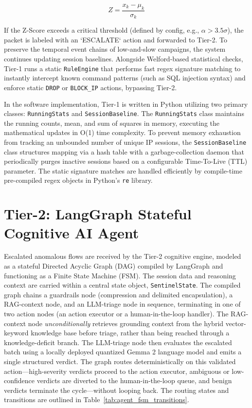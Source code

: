 \begin{equation}
    Z = \frac{x_k - \mu_k}{\sigma_k}
\end{equation}

If the Z-Score exceeds a critical threshold (defined by config, e.g., $\alpha > 3.5\sigma$), the packet is labeled with an `ESCALATE` action and forwarded to Tier-2. To preserve the temporal event chains of low-and-slow campaigns, the system continues updating session baselines. Alongside Welford-based statistical checks, Tier-1 runs a static \texttt{RuleEngine} that performs fast regex signature matching to instantly intercept known command patterns (such as SQL injection syntax) and enforce static \texttt{DROP} or \texttt{BLOCK\_IP} actions, bypassing Tier-2.

In the software implementation, Tier-1 is written in Python utilizing two primary classes: \texttt{RunningStats} and \texttt{SessionBaseline}. The \texttt{RunningStats} class maintains the running counts, mean, and sum of squares in memory, executing the mathematical updates in O(1) time complexity. To prevent memory exhaustion from tracking an unbounded number of unique IP sessions, the \texttt{SessionBaseline} class structures mapping via a hash table with a garbage-collection daemon that periodically purges inactive sessions based on a configurable Time-To-Live (TTL) parameter. The static signature matches are handled efficiently by compile-time pre-compiled regex objects in Python's \texttt{re} library.

\section{Tier-2: LangGraph Stateful Cognitive AI Agent}

Escalated anomalous flows are received by the Tier-2 cognitive engine, modeled as a stateful Directed Acyclic Graph (DAG) compiled by LangGraph \cite{langgraph2024} and functioning as a Finite State Machine (FSM). The session data and reasoning context are carried within a central state object, \texttt{SentinelState}. The compiled graph chains a guardrails node (compression and delimited encapsulation), a RAG-context node, and an LLM-triage node in sequence, terminating in one of two action nodes (an action executor or a human-in-the-loop handler). The RAG-context node \emph{unconditionally} retrieves grounding context from the hybrid vector-keyword knowledge base before triage, rather than being reached through a knowledge-deficit branch. The LLM-triage node then evaluates the escalated batch using a locally deployed quantized Gemma 2 language model \cite{gemma_2_2024} and emits a single structured verdict. The graph routes deterministically on this validated action---high-severity verdicts proceed to the action executor, ambiguous or low-confidence verdicts are diverted to the human-in-the-loop queue, and benign verdicts terminate the cycle---without looping back. The routing states and transitions are outlined in Table~\ref{tab:agent_fsm_transitions}.

